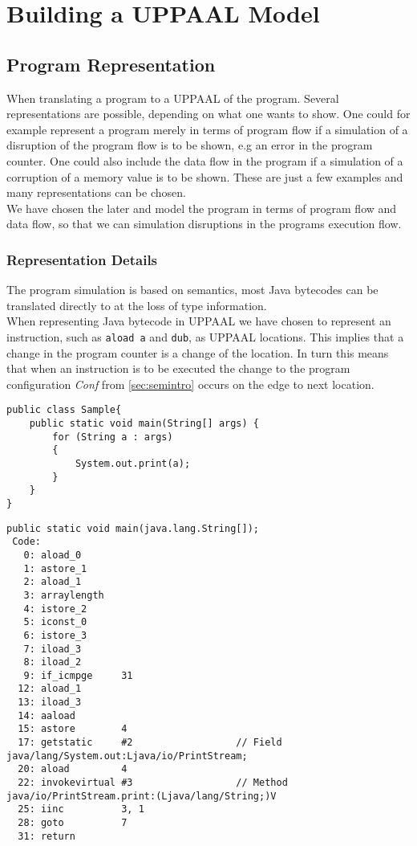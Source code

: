 \chapter{Building a UPPAAL Model}
\section{Program Representation}
When translating a program to a UPPAAL of the program. Several representations are possible, depending on what one wants to show. One could for example represent a program merely in terms of program flow if a simulation of a disruption of the program flow is to be shown, e.g an error in the program counter. One could also include the data flow in the program if a simulation of a corruption of a memory value is to be shown. These are just a few examples and many representations can be chosen.\\

We have chosen the later and model the program in terms of program flow and data flow, so that we can simulation disruptions in the programs execution flow. 


\subsection{Representation Details}
The program simulation is based on \jcl semantics, most Java bytecodes can be translated directly to \jcl at the loss of type information.\\

When representing Java bytecode in UPPAAL we have chosen to represent an instruction, such as \texttt{aload a} and \texttt{dub}, as UPPAAL locations. 
This implies that a change in the program counter is a change of the location. 
In turn this means that when an instruction is to be executed the change to the program configuration \textit{Conf} from  \cref{sec:semintro} occurs on the edge to next location.

\begin{lstlisting}[caption=Jave code.]
public class Sample{
    public static void main(String[] args) {
        for (String a : args)         
        {
            System.out.print(a);
        }
    }
}
\end{lstlisting}

\begin{lstlisting}[caption=Bytecode.]
public static void main(java.lang.String[]);
 Code:
   0: aload_0       
   1: astore_1      
   2: aload_1       
   3: arraylength   
   4: istore_2      
   5: iconst_0      
   6: istore_3      
   7: iload_3       
   8: iload_2       
   9: if_icmpge     31
  12: aload_1       
  13: iload_3       
  14: aaload        
  15: astore        4
  17: getstatic     #2                  // Field java/lang/System.out:Ljava/io/PrintStream;
  20: aload         4
  22: invokevirtual #3                  // Method java/io/PrintStream.print:(Ljava/lang/String;)V
  25: iinc          3, 1
  28: goto          7
  31: return        

\end{lstlisting}

